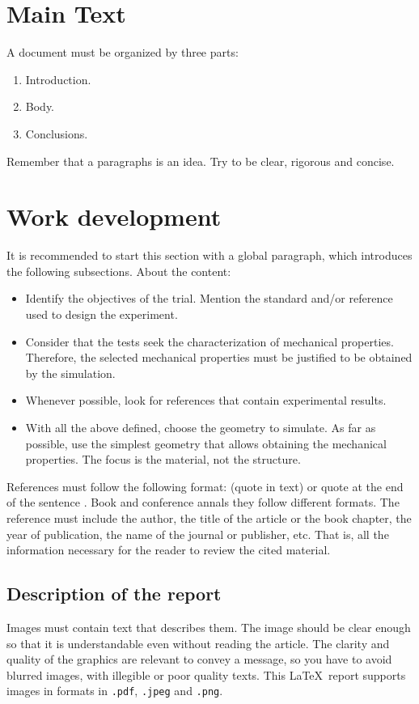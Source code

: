 \section{Main Text}
    A document must be organized by three parts:
        \begin{enumerate}
            \item Introduction.
            \item Body.
            \item Conclusions.
        \end{enumerate}
    Remember that a paragraphs is an idea. Try to be clear, rigorous and concise.

\section{Work development}
    It is recommended to start this section with a global paragraph, which introduces the following subsections. About the content:
        \begin{itemize}
            \item Identify the objectives of the trial. Mention the standard and/or reference used to design the experiment.
            \item Consider that the tests seek the characterization of mechanical properties. Therefore, the selected mechanical properties must be justified to be obtained by the simulation.
            \item Whenever possible, look for references that contain experimental results.
            \item With all the above defined, choose the geometry to simulate. As far as possible, use the simplest geometry that allows obtaining the mechanical properties. The focus is the material, not the structure.
        \end{itemize}

    References must follow the following format: \textcite{Kalamkarov2006} (quote in text) or quote at the end of the sentence \citep{Kopac2005}. Book \citep{Mehta2014} and conference annals \citep{He2005a} they follow different formats. The reference must include the author, the title of the article or the book chapter, the year of publication, the name of the journal or publisher, etc. That is, all the information necessary for the reader to review the cited material.

\subsection{Description of the report}
    Images must contain text that describes them. The image should be clear enough so that it is understandable even without reading the article. The clarity and quality of the graphics are relevant to convey a message, so you have to avoid blurred images, with illegible or poor quality texts. This \LaTeX \ report supports images in formats in \verb|.pdf|, \verb|.jpeg| and \verb|.png|.

